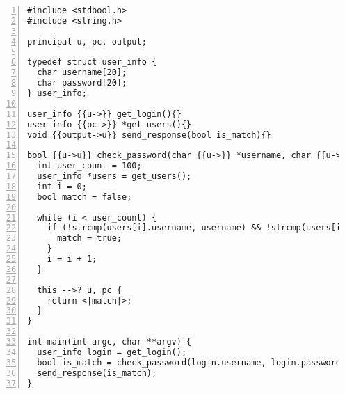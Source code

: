 \begin{lstlisting}[style=dlmc, numbers=left, caption={Inferred labelled password checker example}, label=example:code:check_password-explicit]
#include <stdbool.h>
#include <string.h>

principal u, pc, output;

typedef struct user_info {
  char username[20];
  char password[20];
} user_info;

user_info {{u->}} get_login(){}
user_info {{pc->}} *get_users(){}
void {{output->u}} send_response(bool is_match){}

bool {{u->u}} check_password(char {{u->}} *username, char {{u->}} *password) {
  int user_count = 100;
  user_info *users = get_users();
  int i = 0;
  bool match = false;

  while (i < user_count) {
    if (!strcmp(users[i].username, username) && !strcmp(users[i].password, password)) {
      match = true;
    }
    i = i + 1;
  }

  this -->? u, pc {
    return <|match|>;
  }
}

int main(int argc, char **argv) {
  user_info login = get_login();
  bool is_match = check_password(login.username, login.password);
  send_response(is_match);
}
\end{lstlisting}
